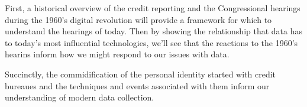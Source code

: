 First, a historical overview of the credit reporting and the Congressional
hearings during the 1960's digital revolution will provide a framework for
which to understand the hearings of today. Then by showing the relationship
that data has to today's most influential technologies, we'll see that the
reactions to the 1960's hearins inform how we might respond to our issues with
data.

Succinctly, the commidification of the personal identity started with credit
bureaues and the techniques and events associated with them inform our
understanding of modern data collection.







